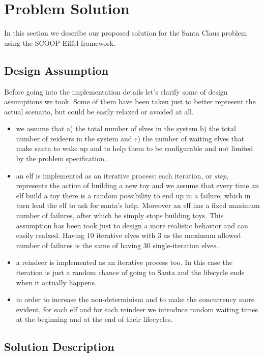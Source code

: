 \section{Problem Solution}
\label{sec:solution}

In this section we describe our proposed solution for the Santa Claus problem using the SCOOP Eiffel framework. 

\subsection{Design Assumption}
\label{subsec:design}

Before going into the implementation details let's clarify some of design assumptions we took. Some of them have been taken just to better represent the actual scenario, but could be easily relaxed or avoided at all.

\begin{itemize}
	\item we assume that a) the total number of elves in the system b) the total number of reideers in the system and c) the number of waiting elves that make santa to wake up and to help them to be configurable and not limited by the problem specification.
	\item an elf is implemented as an iterative process: each iteration, or \textit{step}, represents the action of building a new toy and we assume that every time an elf build a toy there is a random possibility to end up in a failure, which in turn lead the elf to ask for santa's help. Moreover an elf has a fixed maximum number of failures, after which he simply stops building toys. This assumption has been took just to design a more realistic behavior and can easily realxed. Having 10 iterative elves with 3 as the maximum allowed number of failures is the same of having 30 single-iteration elves.
	\item a reindeer is implemented as an iterative process too. In this case the iteration is just a random chance of going to Santa and the lifecycle ends when it actually happens.
	\item in order to increase the non-determinism and to make the concurrency more evident, for each elf and for each reindeer we introduce random waiting times at the beginning and at the end of their lifecycles.
\end{itemize}

\subsection{Solution Description}
\label{subsec:sol}

